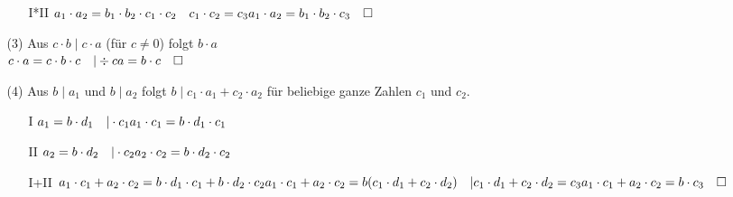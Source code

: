 \documentclass[a4paper]{scrartcl}
\newcommand{\qed}{\quad \square}
\begin{document}
\begin{enumerate}[1.]
\begin{enumerate}
\begin{enumerate}
\item[I*II] $ a_1 \cdot a_2 = b_1 \cdot b_2 \cdot c_1 \cdot c_2 \quad c_1 \cdot c_2 = c_3\\
a_1 \cdot a_2 = b_1 \cdot b_2 \cdot c_3 \qed$
\end{enumerate}
\item[(3)]
Aus $ c \cdot b \mid c \cdot a$ (für $c \ne	0$) folgt $b \cdot a$\\
$c \cdot a = c \cdot b \cdot c \quad | \div c\\
a = b \cdot c \qed$
\item[(4)]
Aus $b \mid a_1$ und $b \mid a_2$ folgt $b \mid c_1 \cdot a_1 + c_2 \cdot a_2$ für beliebige ganze Zahlen $c_1$ und $c_2$.\\
\begin{enumerate}
\item[I] $a_1 = b \cdot d_1 \quad | \cdot c_1\\
a_1 \cdot c_1 = b \cdot d_1 \cdot c_1$
\item[II] $a_2 = b \cdot d_2 \quad | \cdot c_2\\
a_2 \cdot c_2 = b \cdot d_2 \cdot c_2$
\item[I+II] $a_1 \cdot c_1 + a_2 \cdot c_2 = b \cdot d_1 \cdot c_1 + b \cdot d_2 \cdot c_2\\
a_1 \cdot c_1 + a_2 \cdot c_2 = b(c_1 \cdot d_1 + c_2 \cdot d_2) \quad | c_1 \cdot d_1 + c_2 \cdot d_2 = c_3\\
a_1 \cdot c_1 + a_2 \cdot c_2 = b \cdot c_3 \qed$ 
\end{enumerate}
\end{enumerate}
\end{enumerate} 
\end{document}
